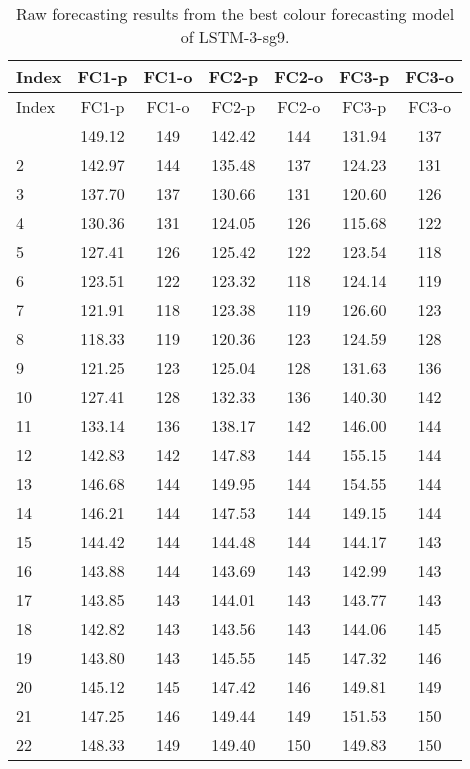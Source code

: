 \begin{center}
\begin{longtable}{lcccccc}
\caption{Raw forecasting results from the best colour forecasting model of LSTM-3-sg9.} \label{forecast-raw-colour} \\
\hline
Index & FC1-p \footnotemark[1] & FC1-o \footnotemark[2] & FC2-p \footnotemark[3] & FC2-o \footnotemark[4] & FC3-p \footnotemark[5] & FC3-o \footnotemark[6] \\
\hline
\endfirsthead

\hline
Index & FC1-p \footnotemark[1] & FC1-o \footnotemark[2] & FC2-p \footnotemark[3] & FC2-o \footnotemark[4] & FC3-p \footnotemark[5] & FC3-o \footnotemark[6] \\
\hline
\endhead
\hline
\endfoot
\hline
\endlastfoot
    1  &149.12&149&142.42&144&131.94&137 \\
    2  &142.97&144&135.48&137&124.23&131 \\
    3  &137.70&137&130.66&131&120.60&126 \\
    4  &130.36&131&124.05&126&115.68&122 \\
    5  &127.41&126&125.42&122&123.54&118 \\
    6  &123.51&122&123.32&118&124.14&119 \\
    7  &121.91&118&123.38&119&126.60&123 \\
    8  &118.33&119&120.36&123&124.59&128 \\
    9  &121.25&123&125.04&128&131.63&136 \\
    10 &127.41&128&132.33&136&140.30&142 \\
    11 &133.14&136&138.17&142&146.00&144 \\
    12 &142.83&142&147.83&144&155.15&144 \\
    13 &146.68&144&149.95&144&154.55&144 \\
    14 &146.21&144&147.53&144&149.15&144 \\
    15 &144.42&144&144.48&144&144.17&143 \\
    16 &143.88&144&143.69&143&142.99&143 \\
    17 &143.85&143&144.01&143&143.77&143 \\
    18 &142.82&143&143.56&143&144.06&145 \\
    19 &143.80&143&145.55&145&147.32&146 \\
    20 &145.12&145&147.42&146&149.81&149 \\
    21 &147.25&146&149.44&149&151.53&150 \\
    22 &148.33&149&149.40&150&149.83&150 \\

\end{longtable}
\end{center}
